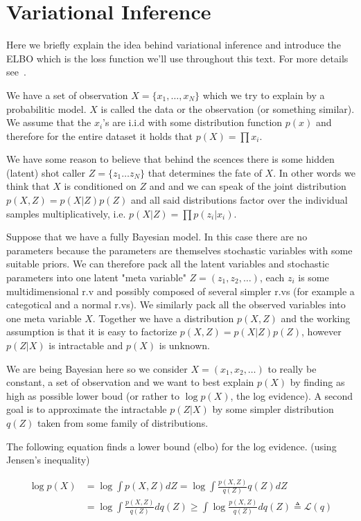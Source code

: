 \documentclass[11pt, a4paper]{report}
\theoremstyle{plain}
\theoremstyle{definition}
\theoremstyle{remark}
\begin{document}
\section{Variational Inference}


Here we briefly explain the idea behind variational inference and introduce the
ELBO which is the loss function we'll use throughout this text.
For more details see~.

We have a set of observation $X = \{x_1, \dots , x_N\}$ which we try to explain
by a probabilitic model. 
$X$ is called the data or the observation (or something similar). We assume that
the $x_i$'s are i.i.d with some distribution function $p(x)$ and therefore for
the entire dataset it holds that $p(X) = \prod x_i$.

We have some reason to believe that behind the scences there is some hidden
(latent) shot caller $Z = \{z_1 \dots z_N\}$ that determines the fate of $X$.
In other words we think that $X$ is conditioned on $Z$ and and we can speak of
the joint distribution $p(X,Z) = p(X|Z)p(Z)$ and all said distributions factor
over the individual samples multiplicatively, i.e.
$p(X|Z) = \prod p(z_i | x_i)$.

Suppose that we have a fully Bayesian model. In this case there are no
parameters because the parameters are themselves stochastic variables with some
suitable priors. We can therefore pack all the latent variables and stochastic
parameters into one latent "meta variable" $Z = (z_1, z_2, \dots )$, each $z_i$
is some multidimensional r.v and possibly composed of several simpler r.vs (for
example a categotical and a normal r.vs).
We similarly pack all the observed variables into one meta variable $X$.
Together we have a distribution $p(X,Z)$ and the working assumption is that it
is easy to factorize $p(X,Z) = p(X|Z)p(Z)$, however $p(Z|X)$ is intractable and
$p(X)$ is unknown.

We are being Bayesian here so we consider $X = (x_1, x_2, \dots)$ to really be
constant, a set of observation and we want to best explain $p(X)$ by finding as
high as possible lower boud (or rather to $\log p(X)$, the log evidence).
A second goal is to approximate the intractable $p(Z|X)$ by some simpler
distribution $q(Z)$ taken from some family of distributions.

The following equation finds a lower bound (elbo) for the log evidence.
(using Jensen's inequality)

\begin{equation}\label{eq:elbo}
\begin{aligned}
\log p(X) &= \log \int p(X,Z) dZ = \log \int \frac{p(X,Z)}{q(Z)} q(Z)dZ \\
&= \log \int \frac{p(X,Z)}{q(Z)}dq(Z) 
\geq \int \log \frac{p(X,Z)}{q(Z)}dq(Z) 
\triangleq \mathcal{L}(q)
\end{aligned}
\end{equation}
\end{document}
